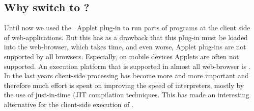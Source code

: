\subsection{Why switch to \JS?}
Until now we used  the \Sapl\ \Java Applet plug-in to run parts of \Clean \Sapl programs at the client side of web-applications.
But this has as a drawback that this plug-in must be loaded into the web-browser, which 
takes time, and  even worse, \Java Applet plug-ins are not supported by all browsers.
Especially, on mobile devices \Java Applets are often not supported.
An execution platform that is supported in almost all web-browser is \JS.
In the last years client-side processing has become more and more important and therefore
much effort is spent on improving the speed of \JS interpreters,
mostly by the use of just-in-time (\textsf{JIT} compilation techniques.
This has made \JS an interesting alternative for the client-side execution of \Sapl.
